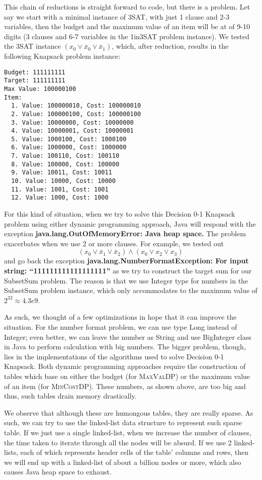 \documentclass[12pt, oneside]{book}
\begin{document}
This chain of reductions is straight forward to code, but there is a
problem. Let say we start with a minimal instance of 3SAT, with just 1
clause and 2-3 variables, then the budget and the maximum value of an
item will be at of 9-10 digits (3 clauses and 6-7 variables in the
1in3SAT problem instance). We tested the 3SAT instance
\((x_{0} \lor \bar{x}_{0} \lor \bar{x}_{1})\), which, after reduction,
results in the following Knapsack problem instance:

\begin{verbatim}
Budget: 111111111
Target: 111111111
Max Value: 100000100
Item:
  1. Value: 100000010, Cost: 100000010
  2. Value: 100000100, Cost: 100000100
  3. Value: 10000000, Cost: 10000000
  4. Value: 10000001, Cost: 10000001
  5. Value: 1000100, Cost: 1000100
  6. Value: 1000000, Cost: 1000000
  7. Value: 100110, Cost: 100110
  8. Value: 100000, Cost: 100000
  9. Value: 10011, Cost: 10011
  10. Value: 10000, Cost: 10000
  11. Value: 1001, Cost: 1001
  12. Value: 1000, Cost: 1000
\end{verbatim}

For this kind of situation, when we try to solve this Decision 0-1
Knapsack problem using either dynamic programming approach, Java will
respond with the exception \textbf{java.lang.OutOfMemoryError: Java heap
space.} The problem exacerbates when we use 2 or more clauses. For
example, we tested out
\[(x_{0} \lor \bar{x}_{1} \lor \bar{x}_{2}) \land (x_{0} \lor x_{2} \lor x_{3})\]
and go back the exception \textbf{java.lang.NumberFormatException: For
input string: ``111111111111111111''} as we try to construct the target
sum for our SubsetSum problem. The reason is that we use Integer type
for numbers in the SubsetSum problem instance, which only accommodates
to the maximum value of \(2^{32} \approx 4.3e9\).

As such, we thought of a few optimizations in hope that it can improve
the situation. For the number format problem, we can use type Long
instead of Integer; even better, we can leave the number as String and
use BigInteger class in Java to perform calculation with big numbers.
The bigger problem, though, lies in the implementations of the
algorithms used to solve Decision 0-1 Knapsack. Both dynamic programming
approaches require the construction of tables which base on either the
budget (for \textsc{MaxValDP}) or the maximum value of an item (for
\textsc{MinCostDP}). These numbers, as shown above, are too big and
thus, such tables drain memory drastically.

We observe that although these are humongous tables, they are really
sparse. As such, we can try to use the linked-list data structure to
represent such sparse table. If we just use a single linked-list, when
we increase the number of clauses, the time taken to iterate through all
the nodes will be absurd. If we use 2 linked-lists, each of which
represents header cells of the table' columns and rows, then we will end
up with a linked-list of about a billion nodes or more, which also
causes Java heap space to exhaust.
\end{document}
